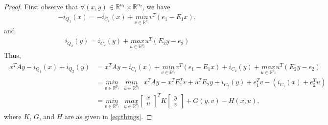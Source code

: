 \documentclass{article} %
\begin{document}
\begin{proof} First observe that $\forall (x, y) \in \mathbb{R}^{n_1} \times \mathbb{R}^{n_2}$, we have
  \begin{eqnarray*}
      -i_{Q_1}(x) = -i_{C_1}(x) + \underset{v \in \mathbb{R}^{p_1}}{min}\text{}{v^T(e_1 - E_1x)},
      \end{eqnarray*}
  and
\begin{eqnarray*}
  i_{Q_2}(y) = i_{C_2}(y) + \underset{u \in \mathbb{R}^{p_2}}{max}\text{}{u^T(E_2y - e_2)}
\end{eqnarray*}
  Thus,%
  \begin{eqnarray*}
    \begin{split}
      x^TAy - i_{Q_1}(x) + i_{Q_2}(y) &= x^TAy -i_{C_1}(x) + \underset{v \in \mathbb{R}^{p_1}}{min}\text{}{v^T(e_1 - E_1x)} + i_{C_2}(y) + \underset{u \in \mathbb{R}^{p_2}}{max}\text{}{u^T(E_2y - e_2)}\\
      &= \underset{v \in \mathbb{R}^{p_1}}{min}\text{ }\underset{u \in \mathbb{R}^{p_2}}{min}\text{ }x^TAy - x^TE_1^Tv + u^TE_2y + i_{C_2}(y) + e_1^Tv -(i_{C_1}(x) + e_2^Tu)\\
      &= \underset{v\in \mathbb{R}^{p_1}}{min}\text{ }\underset{u \in \mathbb{R}^{p_2}}{max}
      {\begin{bmatrix}x\\u\end{bmatrix}^TK\begin{bmatrix}y\\v\end{bmatrix} + G(y, v) - H(x, u)},
    \end{split}
  \end{eqnarray*}
where $K$, $G$, and $H$ are as given in \eqref{eq:things}.


\end{proof}
\end{document}
